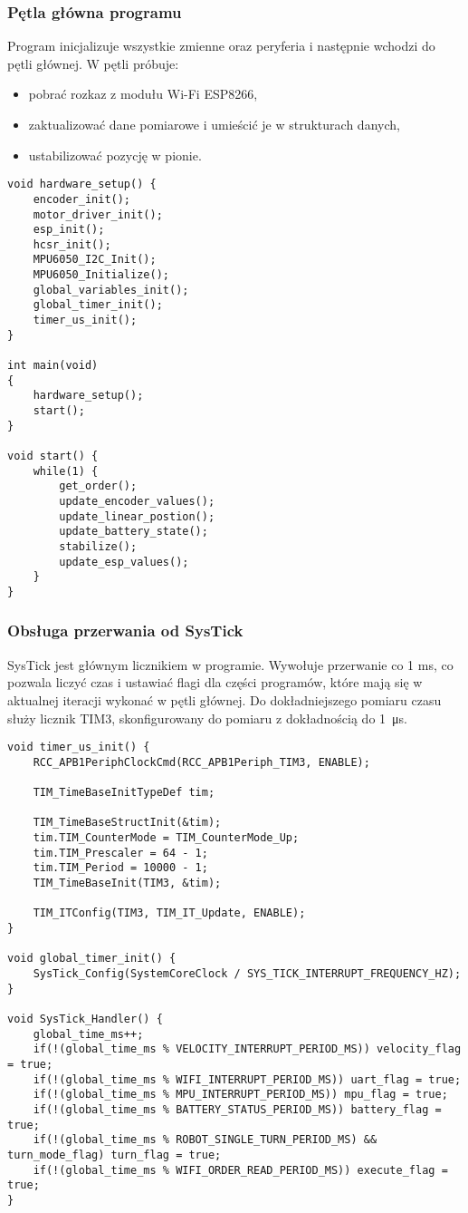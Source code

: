 \documentclass[a4paper,12pt,twoside,openany]{report}
\begin{document}
\subsubsection{Pętla główna programu}

Program inicjalizuje wszystkie zmienne oraz peryferia i następnie wchodzi do pętli głównej. W pętli próbuje: 
\begin{itemize}
\item pobrać rozkaz z modułu Wi-Fi ESP8266, 
\item zaktualizować dane pomiarowe i umieścić je w strukturach danych,
\item ustabilizować pozycję w pionie.
\end{itemize}


\begin{lstlisting}[style=customc]
void hardware_setup() {
	encoder_init();
	motor_driver_init();
	esp_init();
	hcsr_init();
	MPU6050_I2C_Init();
	MPU6050_Initialize();
	global_variables_init();
	global_timer_init();
	timer_us_init();
}

int main(void)
{
	hardware_setup();
	start();
}

void start() {
	while(1) {
		get_order();
		update_encoder_values();
		update_linear_postion();
		update_battery_state();
		stabilize();
		update_esp_values();
	}
}

\end{lstlisting}

\subsubsection{Obsługa przerwania od SysTick}

SysTick jest głównym licznikiem w programie. Wywołuje przerwanie co 1 ms, co pozwala liczyć czas i ustawiać flagi dla części programów, które mają się w aktualnej iteracji wykonać w pętli głównej. Do dokładniejszego pomiaru czasu służy licznik TIM3, skonfigurowany do pomiaru z dokładnością do \SI{1}{\micro s}.

\begin{lstlisting}[style=customc]
void timer_us_init() {
	RCC_APB1PeriphClockCmd(RCC_APB1Periph_TIM3, ENABLE);

	TIM_TimeBaseInitTypeDef tim;

	TIM_TimeBaseStructInit(&tim);
	tim.TIM_CounterMode = TIM_CounterMode_Up;
	tim.TIM_Prescaler = 64 - 1;
	tim.TIM_Period = 10000 - 1;
	TIM_TimeBaseInit(TIM3, &tim);

	TIM_ITConfig(TIM3, TIM_IT_Update, ENABLE);
}

void global_timer_init() {
	SysTick_Config(SystemCoreClock / SYS_TICK_INTERRUPT_FREQUENCY_HZ);
}

void SysTick_Handler() {
	global_time_ms++;
	if(!(global_time_ms % VELOCITY_INTERRUPT_PERIOD_MS)) velocity_flag = true;
	if(!(global_time_ms % WIFI_INTERRUPT_PERIOD_MS)) uart_flag = true;
	if(!(global_time_ms % MPU_INTERRUPT_PERIOD_MS)) mpu_flag = true;
	if(!(global_time_ms % BATTERY_STATUS_PERIOD_MS)) battery_flag = true;
	if(!(global_time_ms % ROBOT_SINGLE_TURN_PERIOD_MS) && turn_mode_flag) turn_flag = true;
	if(!(global_time_ms % WIFI_ORDER_READ_PERIOD_MS)) execute_flag = true;
}
\end{lstlisting}
\end{document}
